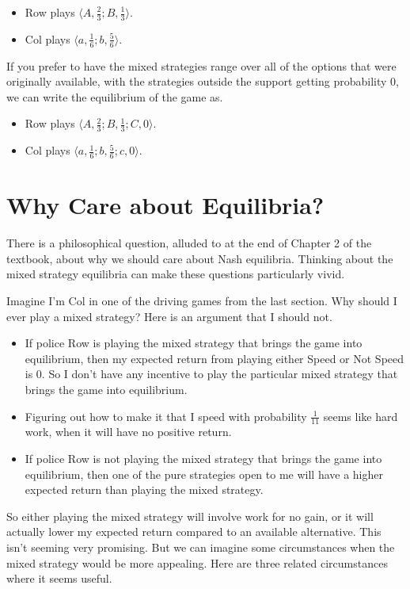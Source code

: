 \documentclass[openany]{book}
\begin{document}
\begin{itemize}
\item Row plays $\langle A, \frac{2}{3}; B, \frac{1}{3} \rangle$.
\item Col plays $\langle a, \frac{1}{6}; b, \frac{5}{6} \rangle$.
\end{itemize}
If you prefer to have the mixed strategies range over all of the options that were originally available, with the strategies outside the support getting probability 0, we can write the equilibrium of the game as.

\begin{itemize}
\item Row plays $\langle A, \frac{2}{3}; B, \frac{1}{3}; C, 0 \rangle$.
\item Col plays $\langle a, \frac{1}{6}; b, \frac{5}{6}; c, 0 \rangle$.
\end{itemize}

\section{Why Care about Equilibria?}
There is a philosophical question, alluded to at the end of Chapter 2 of the textbook, about why we should care about Nash equilibria. Thinking about the mixed strategy equilibria can make these questions particularly vivid.

Imagine I'm Col in one of the driving games from the last section. Why should I ever play a mixed strategy? Here is an argument that I should not.

\begin{itemize}
\item If police Row is playing the mixed strategy that brings the game into equilibrium, then my expected return from playing either Speed or Not Speed is 0. So I don't have any incentive to play the particular mixed strategy that brings the game into equilibrium. 
\item Figuring out how to make it that I speed with probability $\frac{1}{11}$ seems like hard work, when it will have no positive return.
\item If police Row is not playing the mixed strategy that brings the game into equilibrium, then one of the pure strategies open to me will have a higher expected return than playing the mixed strategy.
\end{itemize}
So either playing the mixed strategy will involve work for no gain, or it will actually lower my expected return compared to an available alternative. This isn't seeming very promising. But we can imagine some circumstances when the mixed strategy would be more appealing. Here are three related circumstances where it seems useful.
\end{document}

